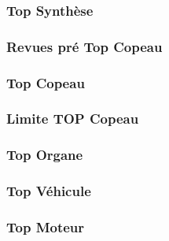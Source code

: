 		\subsubsection*{Top Synthèse} 
 \par 
		\subsubsection*{Revues pré Top Copeau} 
 \par 
		\subsubsection*{Top Copeau} 
 \par 
		\subsubsection*{Limite TOP Copeau} 
 \par 
		\subsubsection*{Top Organe} 
 \par 
		\subsubsection*{Top Véhicule} 
 \par 
		\subsubsection*{Top Moteur} 
 \par 
